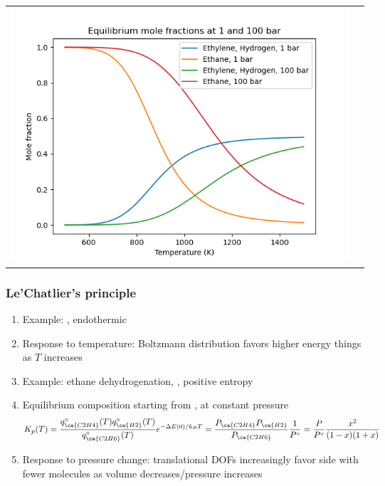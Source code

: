 \documentclass[11pt]{article}
\begin{document}
\begin{table}
\begin{tabular}{cc}
\includegraphics[scale=0.5]{./Images/equilibrium.png} 
\end{tabular}
\end{table}
\subsubsection{Le'Chatlier's principle}
\label{sec:org84caea3}
\begin{enumerate}
\item Example: , endothermic
\item Response to temperature: Boltzmann distribution favors higher energy things as \(T\) increases
\item Example: ethane dehydrogenation, , positive entropy
\item Equilibrium composition starting from , at constant pressure
\[ K_p(T) = \frac{q_{\ce{C2H4}}^\circ(T) q_{\ce{H2}}^\circ(T)}{q_{\ce{C2H6}}^\circ(T)} e^{-\Delta E(0)/k_BT} =  \frac{P_{\ce{C2H4}}P_{\ce{H2}}}{P_{\ce{C2H6}}}\frac{1}{P^\circ} = \frac{P}{P^\circ}\frac{x^2}{(1-x)(1+x)} \]
\item Response to pressure change: translational DOFs increasingly favor side with fewer molecules as volume decreases/pressure increases
\end{enumerate}
\end{document}
